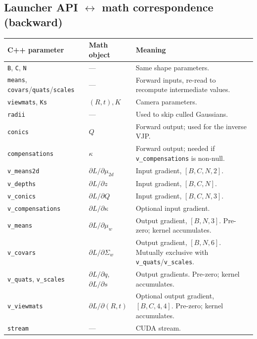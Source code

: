 \documentclass[11pt]{article}
\begin{document}
\subsection{Launcher API \texorpdfstring{$\leftrightarrow$}{<->} math correspondence (backward)}

\begin{center}
\begin{tabular}{l l p{7.5cm}}
\hline
\textbf{C++ parameter} & \textbf{Math object} & \textbf{Meaning} \\
\hline
\texttt{B}, \texttt{C}, \texttt{N} & --- & Same shape parameters. \\
\texttt{means}, \texttt{covars}/\texttt{quats}/\texttt{scales} & --- &
Forward inputs, re-read to recompute intermediate values. \\
\texttt{viewmats}, \texttt{Ks} & $(R, t), K$ & Camera parameters. \\
\texttt{radii} & --- & Used to skip culled Gaussians. \\
\texttt{conics} & $Q$ & Forward output; used for the inverse VJP. \\
\texttt{compensations} & $\kappa$ & Forward output; needed if
\texttt{v\_compensations} is non-null. \\
\texttt{v\_means2d} & $\partial L / \partial \mu_{2d}$ &
Input gradient, $[B,C,N,2]$. \\
\texttt{v\_depths} & $\partial L / \partial z$ &
Input gradient, $[B,C,N]$. \\
\texttt{v\_conics} & $\partial L / \partial Q$ &
Input gradient, $[B,C,N,3]$. \\
\texttt{v\_compensations} & $\partial L / \partial \kappa$ &
Optional input gradient. \\
\texttt{v\_means} & $\partial L / \partial \mu_w$ &
Output gradient, $[B,N,3]$. Pre-zero; kernel accumulates. \\
\texttt{v\_covars} & $\partial L / \partial \Sigma_w$ &
Output gradient, $[B,N,6]$. Mutually exclusive with
\texttt{v\_quats}/\texttt{v\_scales}. \\
\texttt{v\_quats}, \texttt{v\_scales} & $\partial L / \partial q$,
$\partial L / \partial s$ &
Output gradients. Pre-zero; kernel accumulates. \\
\texttt{v\_viewmats} & $\partial L / \partial (R, t)$ &
Optional output gradient, $[B,C,4,4]$. Pre-zero; kernel accumulates. \\
\texttt{stream} & --- & CUDA stream. \\
\hline
\end{tabular}
\end{center}
\end{document}
